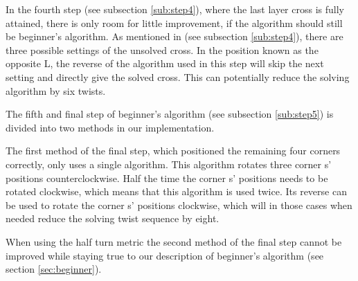 In the fourth step (see subsection \ref{sub:step4}), where the last layer cross is fully attained, there is only room for little improvement, if the algorithm should still be beginner's algorithm.
As mentioned in (see subsection \ref{sub:step4}), there are three possible settings of the unsolved cross.
In the position known as the opposite L, the reverse of the algorithm used in this step will skip the next setting and directly give the solved cross.
This can potentially reduce the solving algorithm by six twists.


The fifth and final step of beginner's algorithm (see subsection \ref{sub:step5}) is divided into two methods in our implementation.


The first method of the final step, which positioned the remaining four corners correctly, only uses a single algorithm.
This algorithm rotates three corner \cpiece{}s' positions counterclockwise.
Half the time the corner \cpiece{}s' positions needs to be rotated clockwise, which means that this algorithm is used twice.
Its reverse can be used to rotate the corner \cpiece{}s' positions clockwise, which will in those cases when needed reduce the solving twist sequence by eight.

When using the half turn metric the second method of the final step cannot be improved while staying true to our description of beginner's algorithm (see section \ref{sec:beginner}).